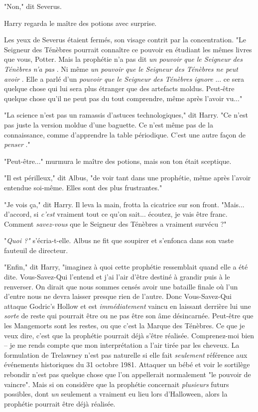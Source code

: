 "Non," dit Severus.

Harry regarda le maître des potions avec surprise.

Les yeux de Severus étaient fermés, son visage contrit par la concentration. "Le Seigneur des Ténèbres pourrait connaître ce pouvoir en étudiant les mêmes livres que vous, Potter. Mais la prophétie n'a pas dit \emph{un pouvoir que le Seigneur des Ténèbres n'a pas} . Ni même \emph{un pouvoir que le Seigneur des Ténèbres ne peut avoir} . Elle a parlé d'un \emph{pouvoir que le Seigneur des Ténèbres ignore} ... ce sera quelque chose qui lui sera plus étranger que des artefacts moldus. Peut-être quelque chose qu'il ne peut pas du tout comprendre, même après l'avoir vu..."

"La science n'est pas un ramassis d'astuces technologiques," dit Harry. "Ce n'est pas juste la version moldue d'une baguette. Ce n'est même pas de la connaissance, comme d'apprendre la table périodique. C'est une autre façon de \emph{penser} ."

"Peut-être..." murmura le maître des potions, mais son ton était sceptique.

"Il est périlleux," dit Albus, "de voir tant dans une prophétie, même après l'avoir entendue soi-même. Elles sont des plus frustrantes."

"Je vois ça," dit Harry. Il leva la main, frotta la cicatrice sur son front. "Mais... d'accord, si \emph{c'est}  vraiment tout ce qu'on sait... écoutez, je vais être franc. Comment \emph{savez-vous}  que le Seigneur des Ténèbres a vraiment survécu ?"

"\emph{Quoi ?" } s'écria-t-elle. Albus ne fit que soupirer et s'enfonca dans son vaste fauteuil de directeur.

"Enfin," dit Harry, "imaginez à quoi cette prophétie ressemblait quand elle a été dite. Vous-Savez-Qui l'entend et j'ai l'air d'être destiné à grandir puis à le renverser. On dirait que nous sommes censés avoir une bataille finale où l'un d'entre nous ne devra laisser presque rien de l'autre. Donc Vous-Savez-Qui attaque Godric's Hollow et est \emph{immédiatement}  vaincu en laissant derrière lui une \emph{sorte } de reste qui pourrait être ou ne pas être son âme désincarnée. Peut-être que les Mangemorts sont les restes, ou que c'est la Marque des Ténèbres. Ce que je veux dire, c'est que la prophétie pourrait déjà s'être réalisée. Comprenez-moi bien – je me rends compte que mon interprétation a l'air tirée par les cheveux. La formulation de Trelawney n'est pas naturelle si elle fait \emph{seulement}  référence aux événements historiques du 31 octobre 1981. Attaquer un bébé et voir le sortilège rebondir n'est pas quelque chose que l'on appellerait normalement "le pouvoir de vaincre". Mais si on considère que la prophétie concernait \emph{plusieurs}  futurs possibles, dont \emph{un}  seulement a vraiment eu lieu lors d'Halloween, alors la prophétie pourrait être déjà réalisée.

